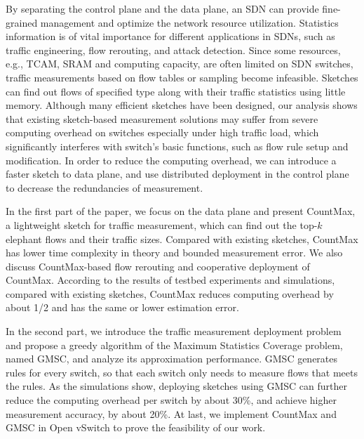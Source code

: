 \begin{enabstract}
By separating the control plane and the data plane, an SDN can provide fine-grained management and optimize the network resource utilization. 
Statistics information is of vital importance for different applications in SDNs, such as traffic engineering, flow rerouting, and attack detection. 
Since some resources, e.g., TCAM, SRAM and computing capacity, are often limited on SDN switches, traffic measurements based on flow tables or sampling become infeasible. 
Sketches can find out flows of specified type along with their traffic statistics using little memory. 
Although many efficient sketches have been designed, our analysis shows that existing sketch-based measurement solutions may suffer from severe computing overhead on switches especially under high traffic load, which significantly interferes with switch's basic functions, such as flow rule setup and modification. 
In order to reduce the computing overhead, we can introduce a faster sketch to data plane, and use distributed deployment in the control plane to decrease the redundancies of measurement.

In the first part of the paper, we focus on the data plane and present CountMax, a lightweight sketch for traffic measurement, which can find out the top-$k$ elephant flows and their traffic sizes. 
Compared with existing sketches, CountMax has lower time complexity in theory and bounded measurement error. 
We also discuss CountMax-based flow rerouting and cooperative deployment of CountMax. 
According to the results of testbed experiments and simulations, compared with existing sketches, CountMax reduces computing overhead by about 1/2 and has the same or lower estimation error.

In the second part, we introduce the traffic measurement deployment problem and propose a greedy algorithm of the Maximum Statistics Coverage problem, named GMSC, and analyze its approximation performance. 
GMSC generates rules for every switch, so that each switch only needs to measure flows that meets the rules.
As the simulations show, deploying sketches using GMSC can further reduce the computing overhead per switch by about 30\%, and achieve higher measurement accuracy, by about 20\%. 
At last, we implement CountMax and GMSC in Open vSwitch to prove the feasibility of our work.

\end{enabstract}